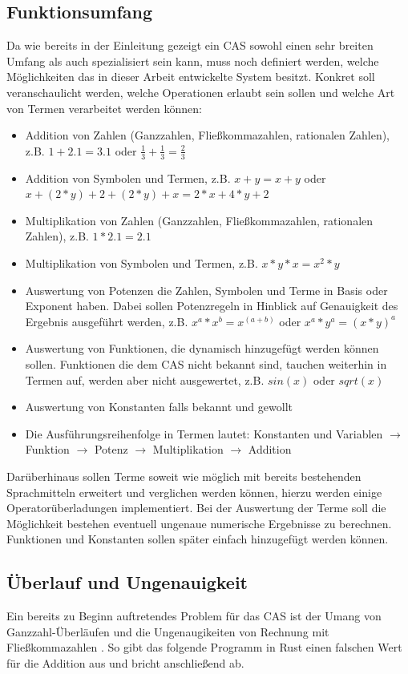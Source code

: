 \documentclass[11pt,a4paper, ngerman]{article}
\begin{document}
\subsection{Funktionsumfang}
Da wie bereits in der Einleitung gezeigt ein CAS sowohl einen sehr breiten Umfang als auch spezialisiert sein kann, muss noch definiert werden, welche Möglichkeiten das in dieser Arbeit entwickelte System besitzt. Konkret soll veranschaulicht werden, welche Operationen erlaubt sein sollen und welche Art von Termen verarbeitet werden können:
\begin{itemize}
    \item Addition von Zahlen (Ganzzahlen, Fließkommazahlen, rationalen Zahlen), z.B. $1+2.1 = 3.1$ oder $\frac{1}{3} + \frac{1}{3} = \frac{2}{3}$
    \item Addition von Symbolen und Termen, z.B. $x+y = x+y$ oder $x+(2*y)+2+(2*y)+x = 2*x+4*y+2$
    \item Multiplikation von Zahlen (Ganzzahlen, Fließkommazahlen, rationalen Zahlen), z.B. $1*2.1 = 2.1$
    \item Multiplikation von Symbolen und Termen, z.B. $x*y*x = x^2*y$
    \item Auswertung von Potenzen die Zahlen, Symbolen und Terme in Basis oder Exponent haben. Dabei sollen Potenzregeln in Hinblick auf Genauigkeit des Ergebnis ausgeführt werden, z.B. $x^a*x^b=x^{(a+b)}$ oder $x^a*y^a = (x*y)^a$
    \item Auswertung von Funktionen, die dynamisch hinzugefügt werden können sollen. Funktionen die dem CAS nicht bekannt sind, tauchen weiterhin in Termen auf, werden aber nicht ausgewertet, z.B. $sin(x)$ oder $sqrt(x)$
    \item Auswertung von Konstanten falls bekannt und gewollt
    \item Die Ausführungsreihenfolge in Termen lautet: Konstanten und Variablen $\rightarrow$ Funktion $\rightarrow$ Potenz $\rightarrow$ Multiplikation $\rightarrow$ Addition
\end{itemize}

Darüberhinaus sollen Terme soweit wie möglich mit bereits bestehenden Sprachmitteln erweitert und verglichen werden können, hierzu werden einige Operatorüberladungen implementiert. Bei der Auswertung der Terme soll die Möglichkeit bestehen eventuell ungenaue numerische Ergebnisse zu berechnen. Funktionen und Konstanten sollen später einfach hinzugefügt werden können.

\subsection{Überlauf und Ungenauigkeit}
Ein bereits zu Beginn auftretendes Problem für das CAS ist der Umang von Ganzzahl-Überläufen und die Ungenaugikeiten von Rechnung mit Fließkommazahlen \cite{IEEE754}. So gibt das folgende Programm in Rust einen falschen Wert für die Addition aus und bricht anschließend ab.
\end{document}
